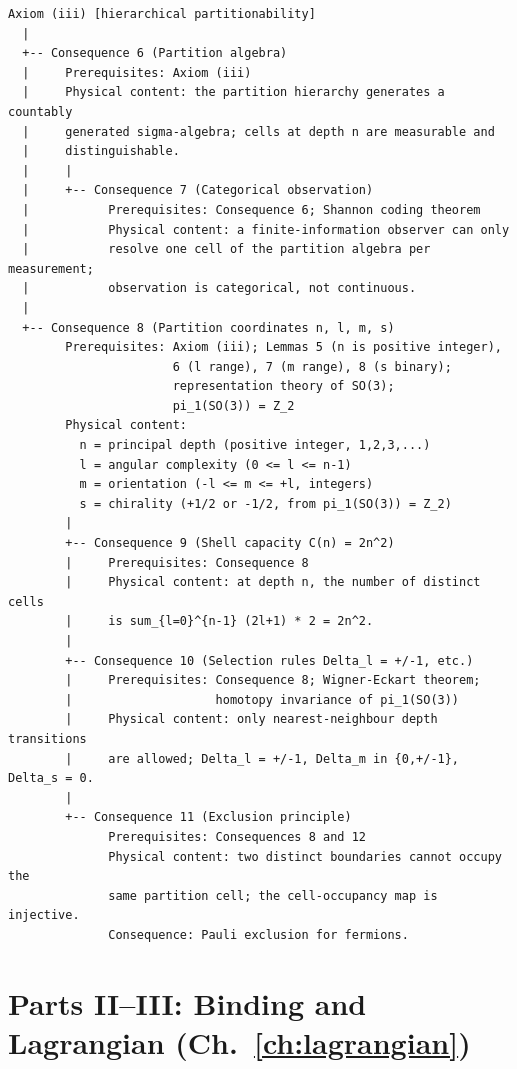\begin{center}
\small\ttfamily
\begin{verbatim}
Axiom (iii) [hierarchical partitionability]
  |
  +-- Consequence 6 (Partition algebra)
  |     Prerequisites: Axiom (iii)
  |     Physical content: the partition hierarchy generates a countably
  |     generated sigma-algebra; cells at depth n are measurable and
  |     distinguishable.
  |     |
  |     +-- Consequence 7 (Categorical observation)
  |           Prerequisites: Consequence 6; Shannon coding theorem
  |           Physical content: a finite-information observer can only
  |           resolve one cell of the partition algebra per measurement;
  |           observation is categorical, not continuous.
  |
  +-- Consequence 8 (Partition coordinates n, l, m, s)
        Prerequisites: Axiom (iii); Lemmas 5 (n is positive integer),
                       6 (l range), 7 (m range), 8 (s binary);
                       representation theory of SO(3);
                       pi_1(SO(3)) = Z_2
        Physical content:
          n = principal depth (positive integer, 1,2,3,...)
          l = angular complexity (0 <= l <= n-1)
          m = orientation (-l <= m <= +l, integers)
          s = chirality (+1/2 or -1/2, from pi_1(SO(3)) = Z_2)
        |
        +-- Consequence 9 (Shell capacity C(n) = 2n^2)
        |     Prerequisites: Consequence 8
        |     Physical content: at depth n, the number of distinct cells
        |     is sum_{l=0}^{n-1} (2l+1) * 2 = 2n^2.
        |
        +-- Consequence 10 (Selection rules Delta_l = +/-1, etc.)
        |     Prerequisites: Consequence 8; Wigner-Eckart theorem;
        |                    homotopy invariance of pi_1(SO(3))
        |     Physical content: only nearest-neighbour depth transitions
        |     are allowed; Delta_l = +/-1, Delta_m in {0,+/-1}, Delta_s = 0.
        |
        +-- Consequence 11 (Exclusion principle)
              Prerequisites: Consequences 8 and 12
              Physical content: two distinct boundaries cannot occupy the
              same partition cell; the cell-occupancy map is injective.
              Consequence: Pauli exclusion for fermions.
\end{verbatim}
\end{center}

\section*{Parts II--III: Binding and Lagrangian (Ch.~\ref{ch:lagrangian})}

